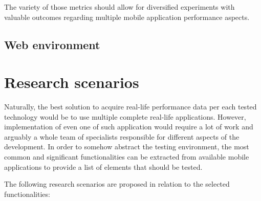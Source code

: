 The variety of those metrics should allow for diversified experiments with valuable outcomes regarding multiple mobile application performance aspects.

\subsection{Web environment}


\section{Research scenarios}

Naturally, the best solution to acquire real-life performance data per each tested technology would be to use multiple complete real-life applications. However, implementation of even one of such application would require a lot of work and arguably a whole team of specialists responsible for different aspects of the development. In order to somehow abstract the testing environment, the most common and significant functionalities can be extracted from available mobile applications to provide a list of elements that should be tested.

\bigskip

The following research scenarios are proposed in relation to the selected functionalities:

